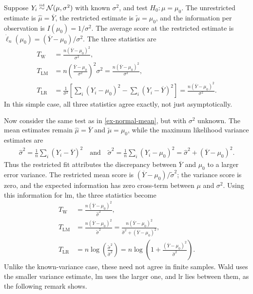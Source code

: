 \documentclass[a4paper,12pt]{article}
\begin{document}
\begin{example}\label{ex-normal-mean}
	Suppose $Y_i\overset{\text{\tiny iid}}{\sim}\operatorname{\mathcal{N}}(\mu,\sigma^2)$ with known $\sigma^2$,
	and test $H_0:\mu=\mu_0$.
	The unrestricted estimate is $\widehat\mu=\overline Y$, the restricted estimate is $\widetilde\mu=\mu_0$,
	and the information per observation is $I(\mu_0)=1/\sigma^2$.
	The average score at the restricted estimate is $\dot\ell_n(\mu_0)=(\overline Y-\mu_0)/\sigma^2$.
	The three statistics are
	\begin{align}
		T_{\mathrm W}&=\frac{n(\overline Y-\mu_0)^2}{\sigma^2},\\
		T_{\mathrm{LM}}&=n\left(\frac{\overline Y-\mu_0}{\sigma^2}\right)^2\sigma^2
		=\frac{n(\overline Y-\mu_0)^2}{\sigma^2},\\
		T_{\mathrm{LR}}&=\frac1{\sigma^2}\left[\sum_i(Y_i-\mu_0)^2-\sum_i(Y_i-\overline Y)^2\right]
		=\frac{n(\overline Y-\mu_0)^2}{\sigma^2}.
	\end{align}
	In this simple case, all three statistics agree exactly, not just asymptotically.
\end{example}

\begin{example}\label{ex-normal-mean-unknown-variance}
	Now consider the same test as in \autoref{ex-normal-mean}, but with $\sigma^2$ unknown.
	The mean estimates remain $\widehat\mu=\overline Y$ and $\widetilde\mu=\mu_0$,
	while the maximum likelihood variance estimates are
	\begin{align*}
		\widehat\sigma^2=\frac1n\sum_i(Y_i-\overline Y)^2
		\quad\text{and}\quad
		\widetilde\sigma^2=\frac1n\sum_i(Y_i-\mu_0)^2
		=\widehat\sigma^2+(\overline Y-\mu_0)^2.
	\end{align*}
	Thus the restricted fit attributes the discrepancy between $\overline Y$ and $\mu_0$ to a larger error variance.
	The restricted mean score is $(\overline Y-\mu_0)/\widetilde\sigma^2$;
	the variance score is zero, and the expected information has zero cross-term between $\mu$ and $\sigma^2$.
	Using this information for \gls{lm}, the three statistics become
	\begin{align*}
		T_{\mathrm W}&=\frac{n(\overline Y-\mu_0)^2}{\widehat\sigma^2},\\
		T_{\mathrm{LM}}&=\frac{n(\overline Y-\mu_0)^2}{\widetilde\sigma^2}
		=\frac{n(\overline Y-\mu_0)^2}{\widehat\sigma^2+(\overline Y-\mu_0)^2},\\
		T_{\mathrm{LR}}&=n\log\left(\frac{\widetilde\sigma^2}{\widehat\sigma^2}\right)
		=n\log\left(1+\frac{(\overline Y-\mu_0)^2}{\widehat\sigma^2}\right).
	\end{align*}
	Unlike the known-variance case, these need not agree in finite samples.
	Wald uses the smaller variance estimate, \gls{lm} uses the larger one, and \gls{lr} lies between them,
	as the following remark shows.
\end{example}
\end{document}
